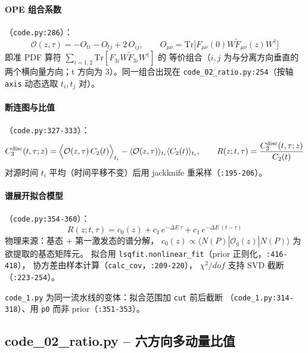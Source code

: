 \documentclass[UTF8]{ctexart}
\begin{document}
\paragraph{OPE 组合系数}（\texttt{code.py:286}）：
\begin{equation}
  \mathcal{O}(z,\tau) = -O_{ti} - O_{tj} + 2\,O_{ij},
  \qquad O_{\mu\nu} = \mathrm{Tr}\big[F_{\mu\nu}(0)W\tilde F_{\mu\nu}(z)W^\dagger\big]
\end{equation}
即准 PDF 算符 $\sum_{i=1,2} \mathrm{Tr}[F_{3i}W\tilde F_{3i}W^\dagger]$ 的
等价组合（$i,j$ 为与分离方向垂直的两个横向量方向；t 方向为 3）。同一组合出现在
\texttt{code\_02\_ratio.py:254}（按轴 \texttt{axis} 动态选取 $t_i,t_j$ 对）。

\paragraph{断连图与比值}（\texttt{code.py:327-333}）：
\begin{equation}
  C_3^{\rm disc}(t,\tau;z) = \Big\langle
  \mathcal{O}(z,\tau)\,C_2(t)\Big\rangle_{t_i} -
  \langle \mathcal{O}(z,\tau)\rangle_{t_i}\langle C_2(t)\rangle_{t_i},
  \qquad
  R(z;t,\tau) = \frac{C_3^{\rm disc}(t,\tau;z)}{C_2(t)}
\end{equation}
对源时间 $t_i$ 平均（时间平移不变）后用 jackknife 重采样（\texttt{:195-206}）。

\paragraph{谱展开拟合模型}（\texttt{code.py:354-360}）：
\begin{equation}
  R(z;t,\tau) = c_0(z) + c_1\,e^{-\Delta E\,\tau} + c_1\,e^{-\Delta E\,(t-\tau)}
\end{equation}
物理来源：基态 + 第一激发态的谱分解，
$c_0(z)\propto\langle N(P)|\mathcal{O}_g(z)|N(P)\rangle$ 为欲提取的基态矩阵元。
拟合用 \texttt{lsqfit.nonlinear\_fit}（prior 正则化，\texttt{:416-418}），
协方差由样本计算（\texttt{calc\_cov}，\texttt{:209-220}），
$\chi^2/dof$ 支持 SVD 截断（\texttt{:223-254}）。

\texttt{code\_1.py} 为同一流水线的变体：拟合范围加 \texttt{cut} 前后截断
（\texttt{code\_1.py:314-318}）、用 \texttt{p0} 而非 prior（\texttt{:351-353}）。

\subsection{code\_02\_ratio.py -- 六方向多动量比值}
\end{document}
